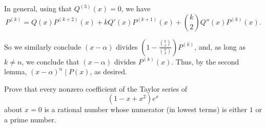 \begin{sol}
	In general, using that \(Q^{(3)}(x) = 0\), we have \[
		P^{(k)} = Q(x)P^{(k+2)}(x) + kQ'(x)P^{(k+1)}(x) + \binom{k}{2}Q''(x)P^{(k)}(x).
	\]

	So we similarly conclude \((x-\alpha)\) divides \(\left(1 - \frac{\binom{k}{2}}{\binom{n}{2}}\right)P^{(k)}\), and, as long as \(k \neq n\), we conclude that \((x-\alpha)\) divides \(P^{(k)}(x)\). Thus, by the second lemma, \((x-\alpha)^n \mid P(x)\), as desired.
\end{sol}

\newpage
\begin{prob}[Putnam 2014, A1]
	Prove that every nonzero coefficient of the Taylor series of \[
		(1 - x + x^2)e^x
	\] about $x=0$ is a rational number whose numerator (in lowest terms) is either $1$ or a prime number.
\end{prob}
